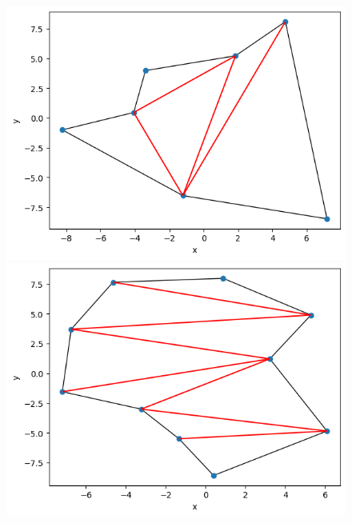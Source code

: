 \documentclass[11pt]{scrartcl}
\begin{document}
    \begin{figure}[H]
        \centering
        \begin{minipage}{0.45\linewidth}
          \centering
          \includegraphics[width=1\linewidth]{3_9.png}
          \caption{}
        \end{minipage}
        \begin{minipage}{0.45\linewidth}
          \centering
          \includegraphics[width=1\linewidth]{3_10.png}
          \caption{}
        \end{minipage}
    \end{figure}
\end{document}
